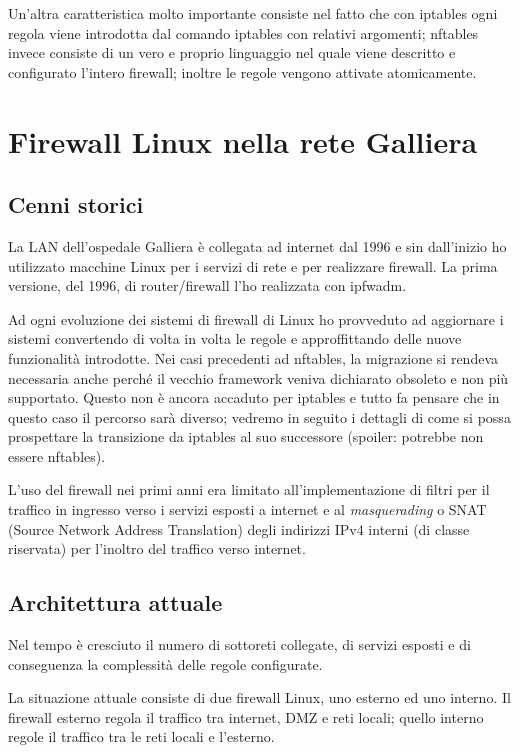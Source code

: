 Un'altra caratteristica molto importante consiste nel fatto che con iptables
ogni regola viene introdotta dal comando iptables con relativi
argomenti; nftables invece consiste di un vero e proprio linguaggio nel quale
viene descritto e configurato l'intero firewall; inoltre le regole vengono
attivate atomicamente.

\chapter{Firewall Linux nella rete Galliera}
\section{Cenni storici}

La LAN dell'ospedale Galliera è collegata ad internet dal 1996 e sin
dall'inizio ho utilizzato macchine Linux per i servizi di rete e per
realizzare firewall.  La prima versione, del 1996, di router/firewall l'ho
realizzata con ipfwadm.

Ad ogni evoluzione dei sistemi di firewall di Linux ho provveduto ad
aggiornare i sistemi convertendo di volta in volta le regole e approffittando
delle nuove funzionalità introdotte.  Nei casi precedenti ad nftables, la
migrazione si rendeva necessaria anche perché il vecchio framework veniva
dichiarato obsoleto e non più supportato.  Questo non è ancora accaduto per
iptables e tutto fa pensare che in questo caso il percorso sarà diverso;
vedremo in seguito i dettagli di come si possa prospettare la transizione da
iptables al suo successore (spoiler: potrebbe non essere nftables).

L'uso del firewall nei primi anni era limitato all'implementazione di filtri
per il traffico in ingresso verso i servizi esposti a internet e al {\em
masquerading} o SNAT (Source Network Address Translation) degli indirizzi IPv4
interni (di classe riservata) per l'inoltro del traffico verso internet.

\section{Architettura attuale}
Nel tempo è cresciuto il numero di sottoreti collegate, di servizi esposti e
di conseguenza la complessità delle regole configurate.

La situazione attuale consiste di due firewall Linux, uno esterno ed uno
interno.  Il firewall esterno regola il traffico tra internet, DMZ e reti
locali; quello interno regole il traffico tra le reti locali e l'esterno.

